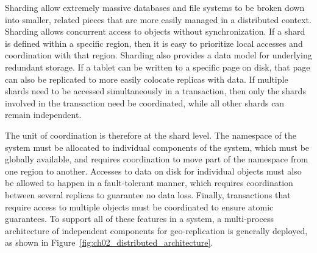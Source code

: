 Sharding allow extremely massive databases and file systems to be broken down into smaller, related pieces that are more easily managed in a distributed context.
Sharding allows concurrent access to objects without synchronization.
If a shard is defined within a specific region, then it is easy to prioritize local accesses and coordination with that region.
Sharding also provides a data model for underlying redundant storage.
If a tablet can be written to a specific page on disk, that page can also be replicated to more easily colocate replicas with data.
If multiple shards need to be accessed simultaneously in a transaction, then
only the shards involved in the transaction need be coordinated, while all other shards can remain independent.

The unit of coordination is therefore at the shard level.
The namespace of the system must be allocated to individual components of the system, which must be globally available, and requires coordination to move part of the namespace from one region to another.
Accesses to data on disk for individual objects must also be allowed to happen in a fault-tolerant manner, which requires coordination between several replicas to guarantee no data loss.
Finally, transactions that require access to multiple objects must be coordinated to ensure atomic guarantees.
To support all of these features in a system, a multi-process architecture of independent components for geo-replication is generally deployed, as shown in Figure~\ref{fig:ch02_distributed_architecture}.

